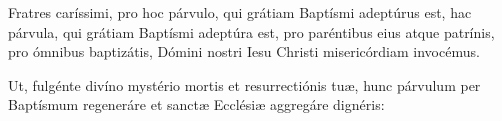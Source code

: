  Fratres caríssimi, pro
\ifparvulus
hoc párvulo, qui grátiam Baptísmi adeptúrus est,
\else
hac párvula, qui grátiam Baptísmi adeptúra est,
\fi
pro paréntibus eius atque patrínis, pro ómnibus baptizátis,
Dómini nostri Iesu Christi mi\-se\-ri\-cór\-di\-am invocémus.

 Ut, fulgénte divíno mystério mortis et resurrectiónis tuæ,
hunc párvulum per Baptísmum regeneráre et sanctæ Ecclésiæ aggregáre
dignéris:

